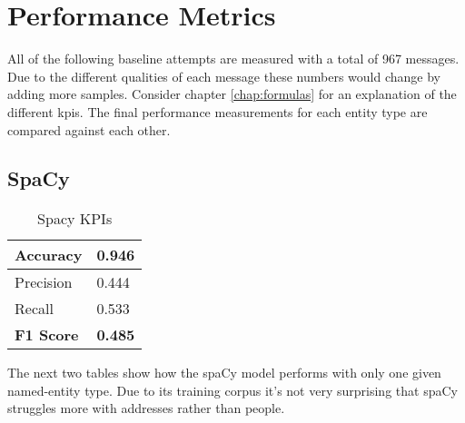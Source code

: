 \chapter{Performance Metrics}

All of the following baseline attempts are measured with a total of 967 messages. Due to the different qualities of each message
these numbers would change by adding more samples. Consider chapter \ref{chap:formulas} for an explanation of the different \acrlong{kpi}s.
The final performance measurements for each entity type are compared against each other.

\section{SpaCy}

\begin{table}[ht!]
    \centering
    \begin{tabular}{|p{6em}|p{3em}|}
        \hline
        Accuracy & 0.946 \\
        \hline
        Precision & 0.444 \\
        \hline
        Recall & 0.533 \\
        \hline
        \textbf{F1 Score} & \textbf{0.485} \\
        \hline
    \end{tabular}
    \caption{Spacy KPIs}
    \label{tbl:perf-spacy}
\end{table}

The next two tables show how the spaCy model performs with only one given named-entity type. Due to its training corpus it's not very
surprising that spaCy struggles more with addresses rather than people.

